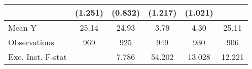 {\begin{tabular}{l*{5}{c}}
            &     (1.251)         &     (0.832)         &     (1.217)         &     (1.021)         &                     \\
\midrule
Mean Y      &       25.14         &       24.93         &        3.79         &        4.30         &       25.11         \\
Observations&         969         &         925         &         949         &         930         &         906         \\
Exc. Inst. F-stat&                     &       7.786         &      54.202         &      13.028         &      12.221         \\
\bottomrule
\end{tabular}
}
